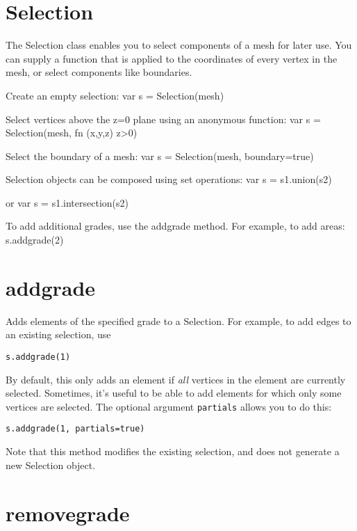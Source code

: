 \hypertarget{selection}{%
\section{Selection}\label{selection}}

The Selection class enables you to select components of a mesh for later
use. You can supply a function that is applied to the coordinates of
every vertex in the mesh, or select components like boundaries.

Create an empty selection: var s = Selection(mesh)

Select vertices above the z=0 plane using an anonymous function: var s =
Selection(mesh, fn (x,y,z) z\textgreater0)

Select the boundary of a mesh: var s = Selection(mesh, boundary=true)

Selection objects can be composed using set operations: var s =
s1.union(s2)

or var s = s1.intersection(s2)

To add additional grades, use the addgrade method. For example, to add
areas: s.addgrade(2)

\hypertarget{addgrade}{%
\section{addgrade}\label{addgrade}}

Adds elements of the specified grade to a Selection. For example, to add
edges to an existing selection, use

\begin{lstlisting}
s.addgrade(1)
\end{lstlisting}

By default, this only adds an element if \emph{all} vertices in the
element are currently selected. Sometimes, it's useful to be able to add
elements for which only some vertices are selected. The optional
argument \texttt{partials} allows you to do this:

\begin{lstlisting}
s.addgrade(1, partials=true)
\end{lstlisting}

Note that this method modifies the existing selection, and does not
generate a new Selection object.

\hypertarget{removegrade}{%
\section{removegrade}\label{removegrade}}

